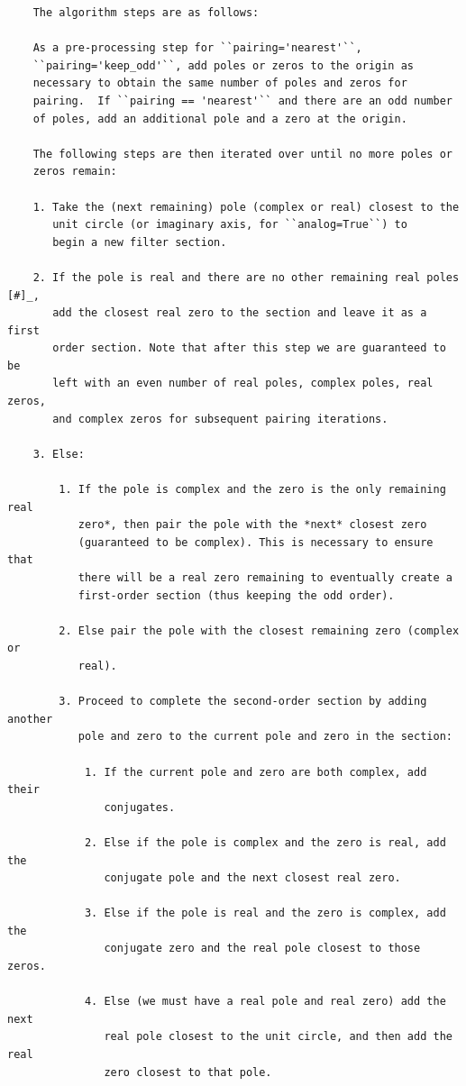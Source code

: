 \documentclass[12pt,a4paper]{article}
\begin{document}
\begin{itemize}
\begin{verbatim}
    The algorithm steps are as follows:

    As a pre-processing step for ``pairing='nearest'``,
    ``pairing='keep_odd'``, add poles or zeros to the origin as
    necessary to obtain the same number of poles and zeros for
    pairing.  If ``pairing == 'nearest'`` and there are an odd number
    of poles, add an additional pole and a zero at the origin.

    The following steps are then iterated over until no more poles or
    zeros remain:

    1. Take the (next remaining) pole (complex or real) closest to the
       unit circle (or imaginary axis, for ``analog=True``) to
       begin a new filter section.

    2. If the pole is real and there are no other remaining real poles [#]_,
       add the closest real zero to the section and leave it as a first
       order section. Note that after this step we are guaranteed to be
       left with an even number of real poles, complex poles, real zeros,
       and complex zeros for subsequent pairing iterations.

    3. Else:

        1. If the pole is complex and the zero is the only remaining real
           zero*, then pair the pole with the *next* closest zero
           (guaranteed to be complex). This is necessary to ensure that
           there will be a real zero remaining to eventually create a
           first-order section (thus keeping the odd order).

        2. Else pair the pole with the closest remaining zero (complex or
           real).

        3. Proceed to complete the second-order section by adding another
           pole and zero to the current pole and zero in the section:

            1. If the current pole and zero are both complex, add their
               conjugates.

            2. Else if the pole is complex and the zero is real, add the
               conjugate pole and the next closest real zero.

            3. Else if the pole is real and the zero is complex, add the
               conjugate zero and the real pole closest to those zeros.

            4. Else (we must have a real pole and real zero) add the next
               real pole closest to the unit circle, and then add the real
               zero closest to that pole.


\end{verbatim}
\end{itemize}
\end{document}
